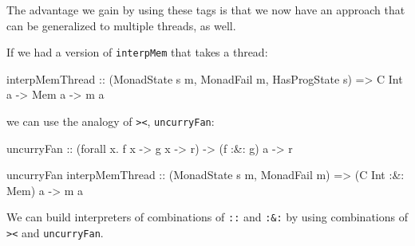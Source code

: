 \documentclass[]{article}
\newenvironment{Shaded}{}{}
\newcommand{\DataTypeTok}[1]{\textcolor[rgb]{0.56,0.13,0.00}{#1}}
\newcommand{\FunctionTok}[1]{\textcolor[rgb]{0.02,0.16,0.49}{#1}}
\newcommand{\NormalTok}[1]{#1}
\newcommand{\OtherTok}[1]{\textcolor[rgb]{0.00,0.44,0.13}{#1}}
\begin{document}
The advantage we gain by using these tags is that we now have an approach that
can be generalized to multiple threads, as well.

If we had a version of \texttt{interpMem} that takes a thread:

\begin{Shaded}
\begin{Highlighting}[]
\NormalTok{interpMemThread}
\OtherTok{    ::}\NormalTok{ (}\DataTypeTok{MonadState}\NormalTok{ s m, }\DataTypeTok{MonadFail}\NormalTok{ m, }\DataTypeTok{HasProgState}\NormalTok{ s)}
    \OtherTok{=>} \DataTypeTok{C} \DataTypeTok{Int}\NormalTok{ a}
    \OtherTok{->} \DataTypeTok{Mem}\NormalTok{ a}
    \OtherTok{->}\NormalTok{ m a}
\end{Highlighting}
\end{Shaded}

we can use the analogy of \texttt{\textgreater{}\textbar{}\textless{}},
\texttt{uncurryFan}:

\begin{Shaded}
\begin{Highlighting}[]
\NormalTok{uncurryFan}
\OtherTok{    ::}\NormalTok{ (forall x}\FunctionTok{.}\NormalTok{ f x }\OtherTok{->}\NormalTok{ g x }\OtherTok{->}\NormalTok{ r)}
    \OtherTok{->}\NormalTok{ (f }\FunctionTok{:&:}\NormalTok{ g) a}
    \OtherTok{->}\NormalTok{ r}

\NormalTok{uncurryFan interpMemThread}
\OtherTok{    ::}\NormalTok{ (}\DataTypeTok{MonadState}\NormalTok{ s m, }\DataTypeTok{MonadFail}\NormalTok{ m)}
    \OtherTok{=>}\NormalTok{ (}\DataTypeTok{C} \DataTypeTok{Int} \FunctionTok{:&:} \DataTypeTok{Mem}\NormalTok{) a}
    \OtherTok{->}\NormalTok{ m a}
\end{Highlighting}
\end{Shaded}

We can build interpreters of combinations of \texttt{:\textbar{}:} and
\texttt{:\&:} by using combinations of
\texttt{\textgreater{}\textbar{}\textless{}} and \texttt{uncurryFan}.
\end{document}
